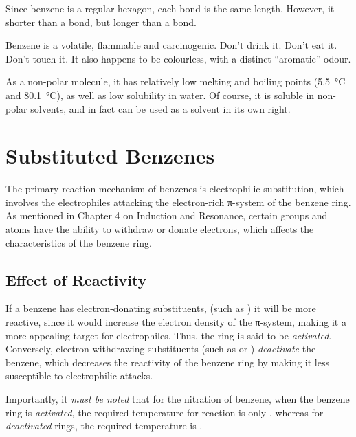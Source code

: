 			Since benzene is a regular hexagon, each  bond is the same length. However, it shorter than a  bond, but longer
			than a  bond.

			Benzene is a volatile, flammable and carcinogenic. Don't drink it. Don't eat it. Don't touch it. It also happens to be colourless,
			with a distinct \enquote{aromatic} odour.

			As a non-polar molecule, it has relatively low melting and boiling points (\SI{5.5}{\celsius} and \SI{80.1}{\celsius}), as well as low
			solubility in water. Of course, it is soluble in non-polar solvents, and in fact can be used as a solvent in its own right.


	\pagebreak
	\section{Substituted Benzenes}

		The primary reaction mechanism of benzenes is electrophilic substitution, which involves the electrophiles attacking the
		electron-rich π-system of the benzene ring. As mentioned in Chapter 4 on Induction and Resonance, certain groups and atoms
		have the ability to withdraw or donate electrons, which affects the characteristics of the benzene ring.


		\subsection{Effect of Reactivity}

			If a benzene has electron-donating substituents, (such as ) it will be more reactive, since it would increase
			the electron density of the π-system, making it a more appealing target for electrophiles. Thus, the ring is said to
			be \textit{activated}. Conversely, electron-withdrawing substituents (such as  or ) \textit{deactivate}
			the benzene, which decreases the reactivity of the benzene ring by making it less susceptible to electrophilic attacks.


			Importantly, it \textit{must be noted} that for the nitration of benzene, when the benzene ring is \textit{activated}, the
			required temperature for reaction is only , whereas for \textit{deactivated} rings, the required
			temperature is .


